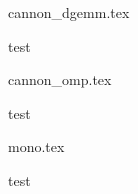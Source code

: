 \begin{figure}[hb]
{cannon_dgemm.tex}
\caption{test}
\end{figure}

\begin{figure}[hb]
{cannon_omp.tex}
\caption{test}
\end{figure}

\begin{figure}[hb]
{mono.tex}
\caption{test}
\end{figure}